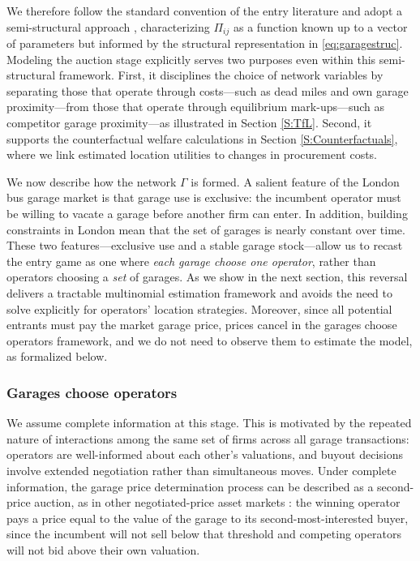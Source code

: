 \documentclass[12pt]{article}
\begin{document}
We therefore follow the standard convention of the entry literature and adopt 
a semi-structural approach \citep[e.g.,][]{Seim2006, Jia2008, Holmes2011, 
ellickson2013estimating}, characterizing $\Pi_{ij}$ as a function known up to 
a vector of parameters but informed by the structural representation in 
\eqref{eq:garagestruc}. Modeling the auction stage explicitly serves two 
purposes even within this semi-structural framework. First, it disciplines the 
choice of network variables by separating those that operate through costs---such 
as dead miles and own garage proximity---from those that operate through 
equilibrium mark-ups---such as competitor garage proximity---as illustrated in 
Section \ref{S:TfL}. Second, it supports the counterfactual welfare calculations 
in Section \ref{S:Counterfactuals}, where we link estimated location utilities 
to changes in procurement costs.

We now describe how the network $\Gamma$ is formed. A salient feature of the 
London bus garage market is that garage use is exclusive: the incumbent operator 
must be willing to vacate a garage before another firm can enter. In addition, building 
constraints in London mean that the set of garages is nearly constant over 
time. These two features---exclusive use and a stable garage stock---allow us 
to recast the entry game as one where \emph{each garage choose one operator}, rather 
than operators choosing a \emph{set} of garages. As we show in the next section, this reversal delivers a tractable multinomial estimation 
framework and avoids the need to solve explicitly for 
operators' location strategies. Moreover, since all potential entrants must pay the market garage price, prices cancel in the garages choose operators framework, and we 
do not need to observe them to estimate the model, as formalized below.

\subsubsection{Garages choose operators}
We assume complete information at this stage. This is motivated by the 
repeated nature of interactions among the same set of firms across all garage 
transactions: operators are well-informed about each other's valuations, and 
buyout decisions involve extended negotiation rather than simultaneous moves. 
Under complete information, the garage price determination process can be 
described as a second-price auction, as in other negotiated-price asset markets 
\citep{allen2019search, Slattery2021}: the winning operator pays a price equal 
to the value of the garage to its second-most-interested buyer, since the 
incumbent will not sell below that threshold and competing operators will not 
bid above their own valuation.
\end{document}
